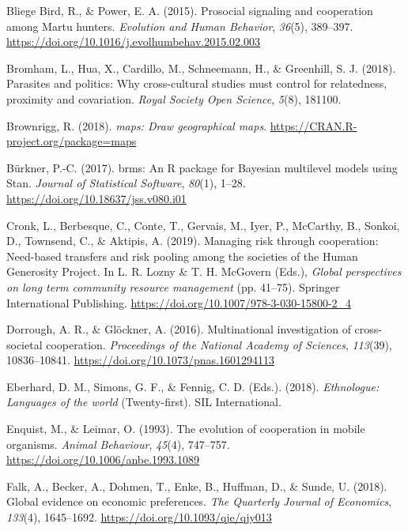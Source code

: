 \documentclass[
  man,floatsintext]{apa6}
\newlength{\cslhangindent}
\newlength{\cslentryspacingunit} %
\newenvironment{CSLReferences}[2] %
 {%
  \setlength{\parindent}{0pt}
  \ifodd #1
  \let\oldpar\par
  \def\par{\hangindent=\cslhangindent\oldpar}
  \fi
  \setlength{\parskip}{#2\cslentryspacingunit}
 }%
 {}
\begin{document}
\begin{CSLReferences}{1}{0}
\leavevmode{}%
Bliege Bird, R., \& Power, E. A. (2015). Prosocial signaling and cooperation among {Martu} hunters. \emph{Evolution and Human Behavior}, \emph{36}(5), 389--397. \url{https://doi.org/10.1016/j.evolhumbehav.2015.02.003}

\leavevmode{}%
Bromham, L., Hua, X., Cardillo, M., Schneemann, H., \& Greenhill, S. J. (2018). Parasites and politics: Why cross-cultural studies must control for relatedness, proximity and covariation. \emph{Royal Society Open Science}, \emph{5}(8), 181100.

\leavevmode{}%
Brownrigg, R. (2018). \emph{{m}aps: Draw geographical maps}. \url{https://CRAN.R-project.org/package=maps}

\leavevmode{}%
Bürkner, P.-C. (2017). {brms}: An {R} package for {Bayesian} multilevel models using {Stan}. \emph{Journal of Statistical Software}, \emph{80}(1), 1--28. \url{https://doi.org/10.18637/jss.v080.i01}

\leavevmode{}%
Cronk, L., Berbesque, C., Conte, T., Gervais, M., Iyer, P., McCarthy, B., Sonkoi, D., Townsend, C., \& Aktipis, A. (2019). Managing risk through cooperation: Need-based transfers and risk pooling among the societies of the {Human Generosity Project}. In L. R. Lozny \& T. H. McGovern (Eds.), \emph{Global perspectives on long term community resource management} (pp. 41--75). Springer International Publishing. \url{https://doi.org/10.1007/978-3-030-15800-2_4}

\leavevmode{}%
Dorrough, A. R., \& Glöckner, A. (2016). Multinational investigation of cross-societal cooperation. \emph{Proceedings of the National Academy of Sciences}, \emph{113}(39), 10836--10841. \url{https://doi.org/10.1073/pnas.1601294113}

\leavevmode{}%
Eberhard, D. M., Simons, G. F., \& Fennig, C. D. (Eds.). (2018). \emph{Ethnologue: Languages of the world} (Twenty-first). SIL International.

\leavevmode{}%
Enquist, M., \& Leimar, O. (1993). The evolution of cooperation in mobile organisms. \emph{Animal Behaviour}, \emph{45}(4), 747--757. \url{https://doi.org/10.1006/anbe.1993.1089}

\leavevmode{}%
Falk, A., Becker, A., Dohmen, T., Enke, B., Huffman, D., \& Sunde, U. (2018). Global evidence on economic preferences. \emph{The Quarterly Journal of Economics}, \emph{133}(4), 1645--1692. \url{https://doi.org/10.1093/qje/qjy013}


\end{CSLReferences}
\end{document}
